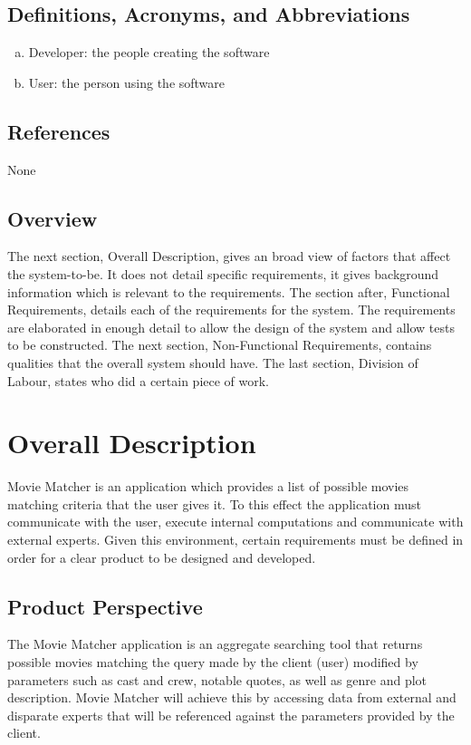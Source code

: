 \documentclass[]{article}
\begin{document}
\subsection{Definitions, Acronyms, and Abbreviations}
\label{sub:definitions_acronyms_and_abbreviations}
\begin{enumerate}[a)]
	\item Developer: the people creating the software
	\item User: the person using the software
\end{enumerate}

\subsection{References}
\label{sub:references}
None

\subsection{Overview}
\label{sub:overview}
The next section, Overall Description, gives an broad view of factors that affect the system-to-be. It does not detail specific requirements, it gives background information which is relevant to the requirements. The section after, Functional Requirements, details each of the requirements for the system. The requirements are elaborated in enough detail to allow the design of the system and allow tests to be constructed. The next section, Non-Functional Requirements, contains qualities that the overall system should have. The last section, Division of Labour, states who did a certain piece of work.


\section{Overall Description}
\label{sec:overall_description}
Movie Matcher is an application which provides a list of possible movies matching criteria that the user
gives it. To this effect the application must communicate with the user, execute internal computations and
communicate with external experts.
Given this environment, certain requirements must be defined in order for a clear product to be designed
and developed.

\subsection{Product Perspective}
\label{sub:product_perspective}
The Movie Matcher application is an aggregate searching tool that returns possible movies matching the query made by the client (user) modified by parameters such as cast and crew, notable quotes, as well as genre and plot description. Movie Matcher will achieve this by accessing data from external and disparate experts that will be referenced against the parameters provided by the client.
\end{document}
